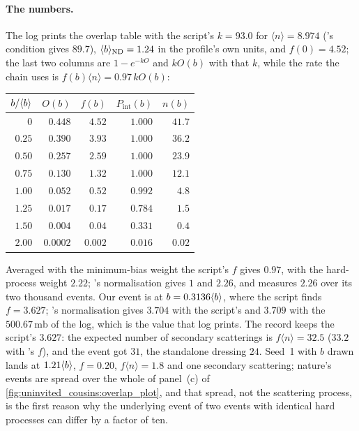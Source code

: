 \paragraph{The numbers.} The log prints the overlap table with the script's
$k=93.0$ for $\langle n\rangle=8.974$ (\PYTHIA's condition gives $89.7$),
$\langle b\rangle_{\mathrm{ND}}=1.24$ in the profile's own units, and $f(0)=4.52$;
the last two columns are $1-e^{-kO}$ and $kO(b)$ with that $k$, while the
rate the chain uses is $f(b)\langle n\rangle=0.97\,kO(b)$:
\begin{center}\footnotesize
\begin{tabular}{rrrrr}\toprule
$b/\langle b\rangle$ & $O(b)$ & $f(b)$ & $P_{\mathrm{int}}(b)$ & $n(b)$ \\ \midrule
$0$ & $0.448$ & $4.52$ & $1.000$ & $41.7$ \\
$0.25$ & $0.390$ & $3.93$ & $1.000$ & $36.2$ \\
$0.50$ & $0.257$ & $2.59$ & $1.000$ & $23.9$ \\
$0.75$ & $0.130$ & $1.32$ & $1.000$ & $12.1$ \\
$1.00$ & $0.052$ & $0.52$ & $0.992$ & $4.8$ \\
$1.25$ & $0.017$ & $0.17$ & $0.784$ & $1.5$ \\
$1.50$ & $0.004$ & $0.04$ & $0.331$ & $0.4$ \\
$2.00$ & $0.0002$ & $0.002$ & $0.016$ & $0.02$ \\
\bottomrule
\end{tabular}
\end{center}
Averaged with the minimum-bias weight the script's $f$ gives $0.97$, with
the hard-process weight $2.22$; \PYTHIA's normalisation gives $1$ and
$2.26$, and \PYTHIA measures $2.26$ over its two thousand events. Our event
is at $b=0.3136\langle b\rangle$, where the script finds $f=3.627$; \PYTHIA's
normalisation gives $3.704$ with the script's \sigint and $3.709$ with the
$500.67\,\mathrm{mb}$ of the \CMSSW log, which is the value that log
prints. The record keeps the script's $3.627$: the expected number of
secondary scatterings is $f\langle n\rangle=32.5$ ($33.2$ with \PYTHIA's
$f$), and the \CMSSW event got $31$, the standalone dressing $24$. Seed~1
with $b$ drawn lands at $1.21\langle b\rangle$, $f=0.20$, $f\langle n\rangle=1.8$ and
one secondary scattering; nature's
events are spread over the whole of panel~(c) of
\cref{fig:uninvited_cousins:overlap_plot}, and that spread, not the
scattering process, is the first reason why the underlying event of two
events with identical hard processes can differ by a factor of ten.

